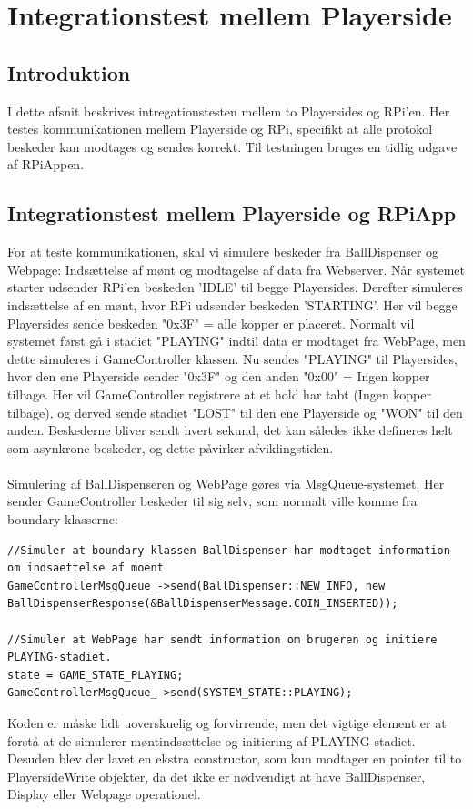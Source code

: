 \documentclass[Integrationstest/Integrationstest_main.tex]{subfiles}
\begin{document}
\lstset{style=customc}

\section{Integrationstest mellem Playerside}
\subsection{Introduktion}
I dette afsnit beskrives intregationstesten mellem to Playersides og RPi'en. Her testes kommunikationen mellem Playerside og RPi, specifikt at alle protokol beskeder kan modtages og sendes korrekt. Til testningen bruges en tidlig udgave af RPiAppen. 
\subsection{Integrationstest mellem Playerside og RPiApp}
For at teste kommunikationen, skal vi simulere beskeder fra BallDispenser og Webpage: Indsættelse af mønt og modtagelse af data fra Webserver. Når systemet starter udsender RPi'en beskeden 'IDLE' til begge Playersides. Derefter simuleres indsættelse af en mønt, hvor RPi udsender beskeden 'STARTING'. Her vil begge Playersides sende beskeden "0x3F" = alle kopper er placeret. Normalt vil systemet først gå i stadiet "PLAYING" indtil data er modtaget fra WebPage, men dette simuleres i GameController klassen. Nu sendes "PLAYING" til Playersides, hvor den ene Playerside sender "0x3F" og den anden "0x00" = Ingen kopper tilbage. Her vil GameController registrere at et hold har tabt (Ingen kopper tilbage), og derved sende stadiet "LOST" til den ene Playerside og "WON" til den anden. Beskederne bliver sendt hvert sekund, det kan således ikke defineres helt som asynkrone beskeder, og dette påvirker afviklingstiden.\\\\
Simulering af BallDispenseren og WebPage gøres via MsgQueue-systemet. Her sender GameController beskeder til sig selv, som normalt ville komme fra boundary klasserne: 
\begin{lstlisting}
//Simuler at boundary klassen BallDispenser har modtaget information om indsaettelse af moent
GameControllerMsgQueue_->send(BallDispenser::NEW_INFO, new BallDispenserResponse(&BallDispenserMessage.COIN_INSERTED));

//Simuler at WebPage har sendt information om brugeren og initiere PLAYING-stadiet. 
state = GAME_STATE_PLAYING;
GameControllerMsgQueue_->send(SYSTEM_STATE::PLAYING);
\end{lstlisting}
Koden er måske lidt uoverskuelig og forvirrende, men det vigtige element er at forstå at de simulerer møntindsættelse og initiering af PLAYING-stadiet. Desuden blev der lavet en ekstra constructor, som kun modtager en pointer til to PlayersideWrite objekter, da det ikke er nødvendigt at have BallDispenser, Display eller Webpage operationel. 
\newpage
\end{document}

